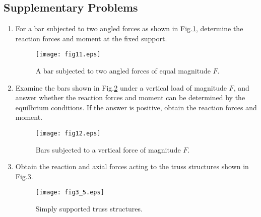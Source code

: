 \documentclass[10pt,a4j]{article}
\begin{document}
\subsection{Supplementary Problems}
\begin{enumerate}
\item
For a bar subjected to two angled forces as shown in Fig.\ref{fig:fig11}, 
determine the reaction forces and moment at the fixed support.
\begin{figure}[h]
	\begin{center}
	\texttt{[image: fig11.eps]} 
	\end{center}
	\caption{A bar subjected to two angled forces of equal magnitude $F$.}
	\label{fig:fig11}
\end{figure}
\item
	Examine the bars shown in Fig.\ref{fig:fig12} under a vertical load 
	of magnitude $F$, and answer whether the reaction forces and 
	moment can be determined by the equilbrium conditions.
	If the answer is positive, obtain the reaction forces and moment. 
\begin{figure}[h]
	\begin{center}
	\texttt{[image: fig12.eps]} 
	\end{center}
	\caption{Bars subjected to a vertical force of magnitude $F$.} 
	\label{fig:fig12}
\end{figure}
\item
Obtain the reaction and axial forces acting to the truss structures shown in Fig.\ref{fig:fig3_5}.
\begin{figure}[h]
	\begin{center}
	\texttt{[image: fig3\_5.eps]} 
	\end{center}
	\caption{Simply supported truss structures.} 
	\label{fig:fig3_5}
\end{figure}
\end{enumerate}
\end{document}
